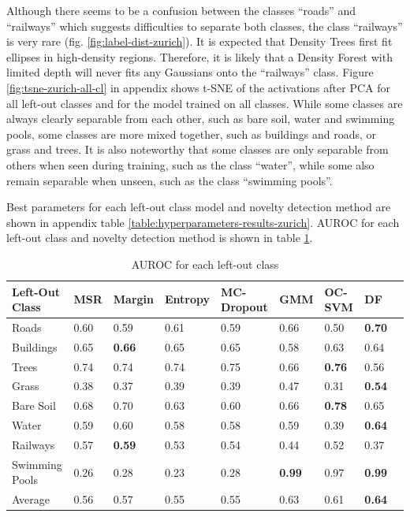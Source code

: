 \documentclass[10pt]{article}
\begin{document}
Although there seems to be a confusion between the classes ``roads'' and ``railways'' which suggests difficulties to separate both classes, the class ``railways'' is very rare (fig. \ref{fig:label-dist-zurich}). It is expected that Density Trees first fit ellipses in high-density regions. Therefore, it is likely that a Density Forest with limited depth will never fits any Gaussians onto the ``railways'' class. Figure \ref{fig:tsne-zurich-all-cl} in appendix shows \gls{t-SNE} of the activations after \gls{PCA} for all left-out classes and for the model trained on all classes. While some classes are always clearly separable from each other, such as bare soil, water and swimming pools, some classes are more mixed together, such as buildings and roads, or grass and trees. It is also noteworthy that some classes are only separable from others when seen during training, such as the class ``water'', while some also remain separable when unseen, such as the class ``swimming pools''.

Best parameters for each left-out class model and novelty detection method are shown in appendix table \ref{table:hyperparameters-results-zurich}. \gls{AUROC} for each left-out class and novelty detection method is shown in table \ref{table:zurich-auroc-nd}.

\begin{table}[H]
    \centering
    \begin{tabular}{@{}lllllllll@{}}
    \toprule
    Left-Out Class & MSR  & Margin     & Entropy & \gls{MC-Dropout} & \gls{GMM}     & \gls{OC-SVM}  & \gls{DF}                \\ \midrule
    Roads          &  0.60 &    0.59 &     0.61 &     0.59 &  0.66 &    0.50 &  \textbf{0.70} \\
    Buildings      &  0.65 &    \textbf{0.66} &     0.65 &     0.65 &  0.58 &    0.63 &  0.64 \\
    Trees          &  0.74 &    0.74 &     0.74 &     0.75 &  0.66 &    \textbf{0.76} &  0.56 \\
    Grass          &  0.38 &    0.37 &     0.39 &     0.39 &  0.47 &    0.31 &  \textbf{0.54} \\
    Bare Soil      &  0.68 &    0.70 &     0.63 &     0.60 &  0.66 &    \textbf{0.78} &  0.65 \\
    Water          &  0.59 &    0.60 &     0.58 &     0.58 &  0.59 &    0.39 &  \textbf{0.64} \\
    Railways       &  0.57 &    \textbf{0.59} &     0.53 &     0.54 &  0.44 &    0.52 &  0.37 \\
    Swimming Pools &  0.26 &    0.28 &     0.23 &     0.28 &  \textbf{0.99} &    0.97 &  \textbf{0.99} \\\midrule
    Average        &  0.56 & 0.57 & 0.55 & 0.55 & 0.63 & 0.61 & \textbf{0.64} \\\bottomrule
    \end{tabular}
    \caption{\gls{AUROC} for each left-out class}
    \label{table:zurich-auroc-nd}
\end{table}
\end{document}
